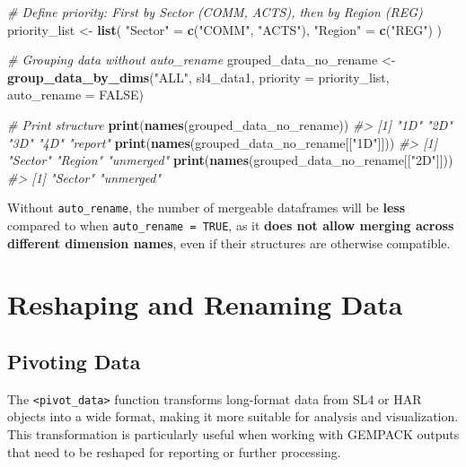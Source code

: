 \documentclass[
]{article}
\newenvironment{Shaded}{\begin{snugshade}}{\end{snugshade}}
\newcommand{\AttributeTok}[1]{\textcolor[rgb]{0.13,0.29,0.53}{#1}}
\newcommand{\CommentTok}[1]{\textcolor[rgb]{0.56,0.35,0.01}{\textit{#1}}}
\newcommand{\ConstantTok}[1]{\textcolor[rgb]{0.56,0.35,0.01}{#1}}
\newcommand{\FunctionTok}[1]{\textcolor[rgb]{0.13,0.29,0.53}{\textbf{#1}}}
\newcommand{\NormalTok}[1]{#1}
\newcommand{\OtherTok}[1]{\textcolor[rgb]{0.56,0.35,0.01}{#1}}
\newcommand{\StringTok}[1]{\textcolor[rgb]{0.31,0.60,0.02}{#1}}
\begin{document}
\begin{Shaded}
\begin{Highlighting}[]
\CommentTok{\# Define priority: First by Sector (COMM, ACTS), then by Region (REG)}
\NormalTok{priority\_list }\OtherTok{\textless{}{-}} \FunctionTok{list}\NormalTok{(}
  \StringTok{"Sector"} \OtherTok{=} \FunctionTok{c}\NormalTok{(}\StringTok{"COMM"}\NormalTok{, }\StringTok{"ACTS"}\NormalTok{),}
  \StringTok{"Region"} \OtherTok{=} \FunctionTok{c}\NormalTok{(}\StringTok{"REG"}\NormalTok{)}
\NormalTok{)}

\CommentTok{\# Grouping data without auto\_rename}
\NormalTok{grouped\_data\_no\_rename }\OtherTok{\textless{}{-}} \FunctionTok{group\_data\_by\_dims}\NormalTok{(}\StringTok{"ALL"}\NormalTok{, sl4\_data1, }
                                             \AttributeTok{priority =}\NormalTok{ priority\_list, }
                                             \AttributeTok{auto\_rename =} \ConstantTok{FALSE}\NormalTok{)}

\CommentTok{\# Print structure}
\FunctionTok{print}\NormalTok{(}\FunctionTok{names}\NormalTok{(grouped\_data\_no\_rename))}
\CommentTok{\#\textgreater{} [1] "1D"     "2D"     "3D"     "4D"     "report"}
\FunctionTok{print}\NormalTok{(}\FunctionTok{names}\NormalTok{(grouped\_data\_no\_rename[[}\StringTok{"1D"}\NormalTok{]]))}
\CommentTok{\#\textgreater{} [1] "Sector"   "Region"   "unmerged"}
\FunctionTok{print}\NormalTok{(}\FunctionTok{names}\NormalTok{(grouped\_data\_no\_rename[[}\StringTok{"2D"}\NormalTok{]]))}
\CommentTok{\#\textgreater{} [1] "Sector"   "unmerged"}
\end{Highlighting}
\end{Shaded}

Without \texttt{auto\_rename}, the number of mergeable dataframes will
be \textbf{less} compared to when \texttt{auto\_rename\ =\ TRUE}, as it
\textbf{does not allow merging across different dimension names}, even
if their structures are otherwise compatible.

\section{Reshaping and Renaming Data}\label{reshaping-and-renaming-data}

\subsection{Pivoting Data}\label{pivoting-data}

The \texttt{\textless{}pivot\_data\textgreater{}} function transforms
long-format data from SL4 or HAR objects into a wide format, making it
more suitable for analysis and visualization. This transformation is
particularly useful when working with GEMPACK outputs that need to be
reshaped for reporting or further processing.
\end{document}
